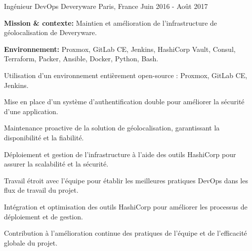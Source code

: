 \begin{cventries}
{\begin{cvitems}
{%
\cventry
{Ingénieur DevOps} %
{Deveryware} %
{Paris, France} %
{Juin 2016 - Août 2017} %
{
  \begin{cvitems} %
    \item {\textbf{Mission \& contexte:} Maintien et amélioration de l'infrastructure de géolocalisation de Deveryware.}
    \item {\textbf{Environnement:} Proxmox, GitLab CE, Jenkins, HashiCorp Vault, Consul, Terraform, Packer, Ansible, Docker, Python, Bash.}
    \item {Utilisation d'un environnement entièrement open-source : Proxmox, GitLab CE, Jenkins.}
    \item {Mise en place d'un système d'authentification double pour améliorer la sécurité d'une application.}
    \item {Maintenance proactive de la solution de géolocalisation, garantissant la disponibilité et la fiabilité.}
    \item {Déploiement et gestion de l'infrastructure à l'aide des outils HashiCorp pour assurer la scalabilité et la sécurité.}
    \item {Travail étroit avec l'équipe pour établir les meilleures pratiques DevOps dans les flux de travail du projet.}
    \item {Intégration et optimisation des outils HashiCorp pour améliorer les processus de déploiement et de gestion.}
    \item {Contribution à l'amélioration continue des pratiques de l'équipe et de l'efficacité globale du projet.}
  \end{cvitems}
}

}
\end{cvitems}}
\end{cventries}
